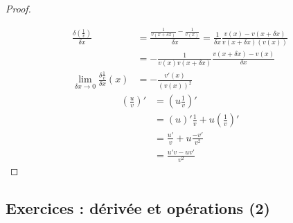 \documentclass[main.tex]{subfiles}
\begin{document}
\begin{proof}
\begin{marginfigure}
\begin{tikzpicture}[scale=0.80]
	\end{tikzpicture} 
	\caption{Illustration de la différence $(uv)(x+\delta x)-(uv)(x)$ }
\end{marginfigure}  
	\setlength{\abovedisplayskip}{3pt}
	\setlength{\belowdisplayskip}{3pt}
	\begin{align*}
		\frac{\delta (\tfrac{1}{v})}{\delta x}&=  \frac{  \frac{1}{v(x+\delta x)} - \frac{1}{v(x)}}{\delta x} = \frac{1}{\delta x}\frac{v(x)-v(x+\delta x)}{v(x+\delta x)(v(x))} \\
		& = -\frac{1}{v(x)v(x+\delta x)}\frac{v(x+\delta x)-v(x)}{\delta x}\\
		\lim_{\delta x\to 0} \frac{\delta \tfrac{1}{v}}{\delta x} (x)	
		& = -\frac{v'(x)}{(v(x))^2}
	\end{align*} 
\setlength{\abovedisplayskip}{3pt}
\setlength{\belowdisplayskip}{3pt}
\begin{align*}
\left(\frac{u}{v}\right)'&= \left(u\frac{1}{v}\right)'\\
& = \left(u\right)' \frac{1}{v} + u \left(\frac{1}{v}\right)'\\
& = \frac{u'}{v} + u \frac{-v'}{v^2}\\
& = \frac{u'v-uv'}{v^2}
\end{align*} 
\end{proof} 
%	 
\newpage 
{}  
\pagestyle{scrheadings} %
\onehalfspacing
\subsection{Exercices : dérivée et opérations (2)}
\end{document}
